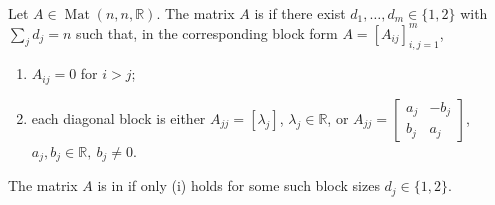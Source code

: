 \begin{definition} \label{def:almost-upper-triangular-real-matrix} \\
Let $A\in\operatorname{Mat}(n,n,\mathbb{R})$. The matrix $A$ is  if there exist $d_1,\ldots,d_m\in\{1,2\}$ with $\sum_jd_j=n$ such that, in the corresponding block form $A=[A_{ij}]_{i,j=1}^{m}$,
\begin{enumerate}[label=(\roman*)]
\setlength{\itemsep}{0pt}
\item $A_{ij}=0$ for $i>j$;
\item each diagonal block is either $A_{jj}=[\lambda_j]$, $\lambda_j\in\mathbb{R}$, or $A_{jj}=
\begin{bmatrix}
a_j&-b_j\\
b_j&a_j
\end{bmatrix}$, $a_j,b_j\in\mathbb{R},\ b_j\neq0$.
\end{enumerate}
The matrix $A$ is in  if only (i) holds for some such block sizes $d_j\in\{1,2\}$.
\end{definition}

